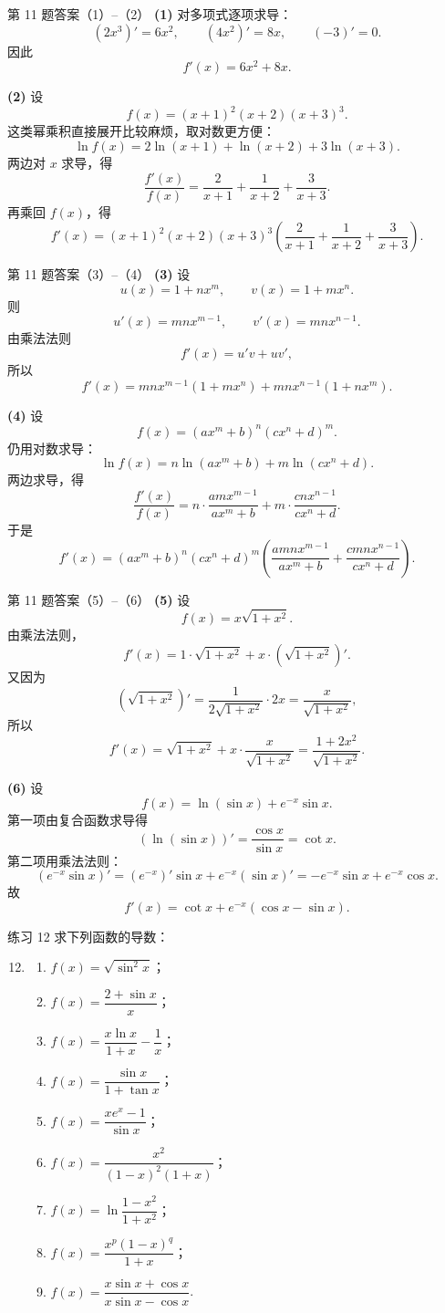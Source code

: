 ﻿\documentclass[aspectratio=169,11pt]{ctexbeamer}
\begin{document}
\begin{frame}{第 11 题答案（1）--（2）}
\scriptsize
\textbf{(1)} 对多项式逐项求导：
\[
(2x^3)'=6x^2,\qquad (4x^2)'=8x,\qquad (-3)'=0.
\]
因此
\[
f'(x)=6x^2+8x.
\]

\textbf{(2)} 设
\[
f(x)=(x+1)^2(x+2)(x+3)^3.
\]
这类幂乘积直接展开比较麻烦，取对数更方便：
\[
\ln f(x)=2\ln(x+1)+\ln(x+2)+3\ln(x+3).
\]
两边对 $x$ 求导，得
\[
\frac{f'(x)}{f(x)}=\frac{2}{x+1}+\frac{1}{x+2}+\frac{3}{x+3}.
\]
再乘回 $f(x)$，得
\[
f'(x)=(x+1)^2(x+2)(x+3)^3
\left(\frac{2}{x+1}+\frac{1}{x+2}+\frac{3}{x+3}\right).
\]
\end{frame}

\begin{frame}{第 11 题答案（3）--（4）}
\scriptsize
\textbf{(3)} 设
\[
u(x)=1+nx^m,\qquad v(x)=1+mx^n.
\]
则
\[
u'(x)=mnx^{m-1},\qquad v'(x)=mnx^{n-1}.
\]
由乘法法则
\[
f'(x)=u'v+uv',
\]
所以
\[
f'(x)=mnx^{m-1}(1+mx^n)+mnx^{n-1}(1+nx^m).
\]

\textbf{(4)} 设
\[
f(x)=(ax^m+b)^n(cx^n+d)^m.
\]
仍用对数求导：
\[
\ln f(x)=n\ln(ax^m+b)+m\ln(cx^n+d).
\]
两边求导，得
\[
\frac{f'(x)}{f(x)}
=n\cdot\frac{amx^{m-1}}{ax^m+b}
+m\cdot\frac{cnx^{n-1}}{cx^n+d}.
\]
于是
\[
f'(x)=(ax^m+b)^n(cx^n+d)^m
\left(\frac{amnx^{m-1}}{ax^m+b}+\frac{cmnx^{n-1}}{cx^n+d}\right).
\]
\end{frame}

\begin{frame}{第 11 题答案（5）--（6）}
\scriptsize
\textbf{(5)} 设
\[
f(x)=x\sqrt{1+x^2}.
\]
由乘法法则，
\[
f'(x)=1\cdot\sqrt{1+x^2}+x\cdot(\sqrt{1+x^2})'.
\]
又因为
\[
(\sqrt{1+x^2})'=\frac{1}{2\sqrt{1+x^2}}\cdot 2x=\frac{x}{\sqrt{1+x^2}},
\]
所以
\[
f'(x)=\sqrt{1+x^2}+x\cdot\frac{x}{\sqrt{1+x^2}}
=\frac{1+2x^2}{\sqrt{1+x^2}}.
\]

\textbf{(6)} 设
\[
f(x)=\ln(\sin x)+e^{-x}\sin x.
\]
第一项由复合函数求导得
\[
(\ln(\sin x))'=\frac{\cos x}{\sin x}=\cot x.
\]
第二项用乘法法则：
\[
(e^{-x}\sin x)'=(e^{-x})'\sin x+e^{-x}(\sin x)'
=-e^{-x}\sin x+e^{-x}\cos x.
\]
故
\[
f'(x)=\cot x+e^{-x}(\cos x-\sin x).
\]
\end{frame}

\begin{frame}{练习 12}
\scriptsize
求下列函数的导数：
\begin{enumerate}
\setcounter{enumi}{11}
\item
\begin{enumerate}
\item $f(x)=\sqrt{\sin^2 x}$；
\item $f(x)=\dfrac{2+\sin x}{x}$；
\item $f(x)=\dfrac{x\ln x}{1+x}-\dfrac1x$；
\item $f(x)=\dfrac{\sin x}{1+\tan x}$；
\item $f(x)=\dfrac{xe^x-1}{\sin x}$；
\item $f(x)=\dfrac{x^2}{(1-x)^2(1+x)}$；
\item $f(x)=\ln\!\dfrac{1-x^2}{1+x^2}$；
\item $f(x)=\dfrac{x^p(1-x)^q}{1+x}$；
\item $f(x)=\dfrac{x\sin x+\cos x}{x\sin x-\cos x}$.
\end{enumerate}
\end{enumerate}
\end{frame}
\end{document}
